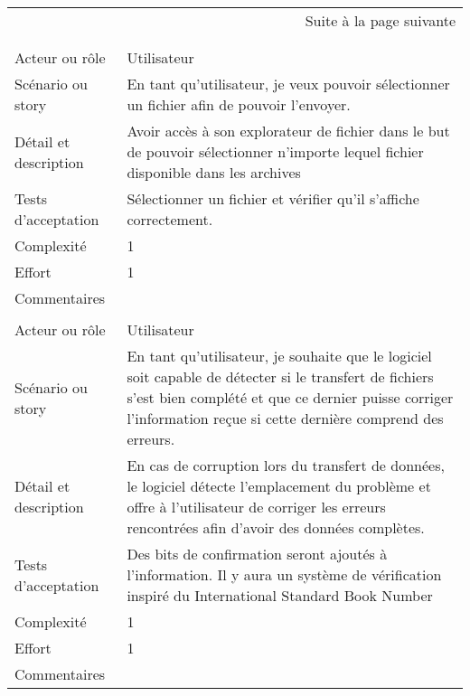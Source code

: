 \begin{longtable}{|l|p{}|}
\multicolumn{2}{r}{Suite à la page suivante} \\
\endfoot

\multicolumn{2}{r}{} \\
\endlastfoot

\hline
    \rowcolor{Gray}
    \multicolumn{2}{|l|}{1} \\
\hline
    Acteur ou rôle & Utilisateur \\
\hline
    Scénario ou story & En tant qu'utilisateur, 
      je veux pouvoir sélectionner un fichier
      afin de pouvoir l'envoyer. \\
\hline
    Détail et description & 
    Avoir accès à son explorateur de fichier dans le but de pouvoir sélectionner n'importe lequel fichier disponible dans les archives \\
       
\hline
    Tests d'acceptation & Sélectionner un fichier et vérifier qu'il s'affiche correctement. \\
\hline
    Complexité & 1 \\
\hline
    Effort & 1 \\
\hline
    Commentaires &  \\

\hline
    \rowcolor{Gray}
    \multicolumn{2}{|l|}{2} \\
\hline
    Acteur ou rôle & Utilisateur \\
\hline
    Scénario ou story & En tant qu'utilisateur,
          je souhaite que le logiciel soit capable de détecter
          si le transfert de fichiers s'est bien complété et que
          ce dernier puisse corriger l'information reçue si cette
          dernière comprend des erreurs.\\
\hline
    Détail et description & En cas de corruption lors du transfert de données, le logiciel détecte l'emplacement du problème et offre à l'utilisateur de corriger les erreurs rencontrées afin d'avoir des données complètes.\\
\hline
    Tests d'acceptation & Des bits de confirmation seront ajoutés à l'information. Il y aura un système de vérification inspiré du International Standard Book Number\\
\hline
    Complexité & 1 \\
\hline
    Effort & 1 \\
\hline
    Commentaires &  \\


\end{longtable}
